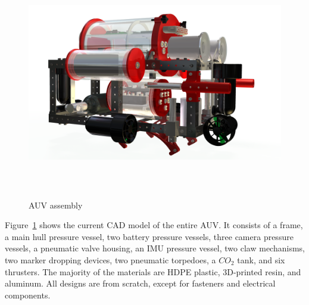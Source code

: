 \documentclass[12pt, landscape]{article}
\begin{document}
\begin{samepage}
\begin{figure}[H]
\centering
\includegraphics[height=4in]{media/FULL-ASSEMBLY-2-ALPHA.png}
\caption{AUV assembly}
\label{auv_assembly}
\end{figure}

Figure~\ref{auv_assembly} shows the current CAD model of the entire AUV. It consists of a frame, a main hull pressure vessel, two battery pressure vessels, three camera pressure vessels, a pneumatic valve housing, an IMU pressure vessel, two claw mechanisms, two marker dropping devices, two pneumatic torpedoes, a $CO_2$ tank, and six thrusters.  The majority of the materials are HDPE plastic, 3D-printed resin, and aluminum.  All designs are from scratch, except for fasteners and electrical components. 
\end{samepage}
\end{document}
